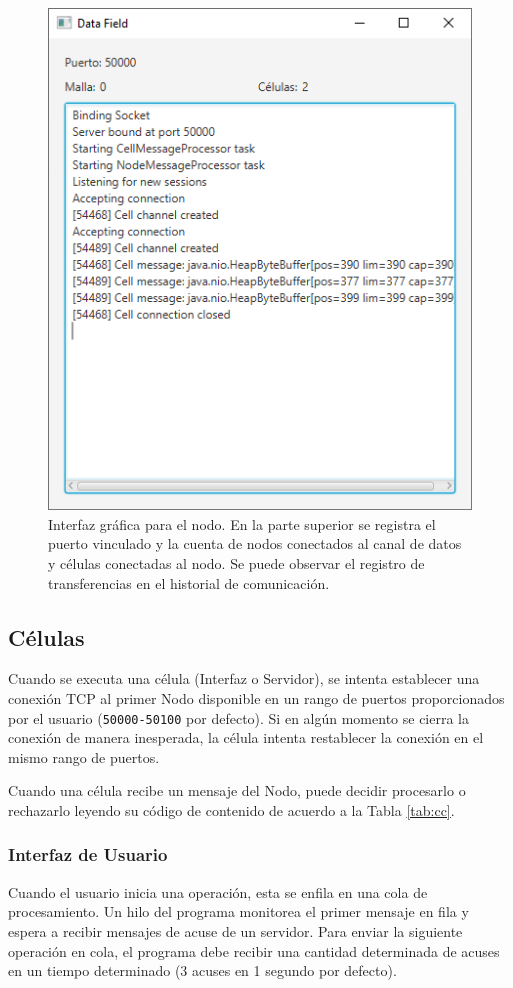 \documentclass[conference,compsoc]{IEEEtran}
\begin{document}
\begin{figure}[hbt]
    \centering
    \includegraphics[width=0.7\columnwidth]{nodefx.png}
    \caption{Interfaz gráfica para el nodo. En la parte superior se registra el puerto vinculado y la cuenta de nodos conectados al canal de datos y células conectadas al nodo. Se puede observar el registro de transferencias en el historial de comunicación.}
    \label{fig:nodefx}
\end{figure}

\subsection{Células}

Cuando se executa una célula (Interfaz o Servidor), se intenta establecer una conexión TCP al primer Nodo disponible en un rango de puertos proporcionados por el usuario (\texttt{50000-50100} por defecto). Si en algún momento se cierra la conexión de manera inesperada, la célula intenta restablecer la conexión en el mismo rango de puertos.

Cuando una célula recibe un mensaje del Nodo, puede decidir procesarlo o rechazarlo leyendo su código de contenido de acuerdo a la Tabla \ref{tab:cc}.

\subsubsection{Interfaz de Usuario}

Cuando el usuario inicia una operación, esta se enfila en una cola de procesamiento. Un hilo del programa monitorea el primer mensaje en fila y espera a recibir mensajes de acuse de un servidor. Para enviar la siguiente operación en cola, el programa debe recibir una cantidad determinada de acuses en un tiempo determinado (3 acuses en 1 segundo por defecto).
\end{document}

